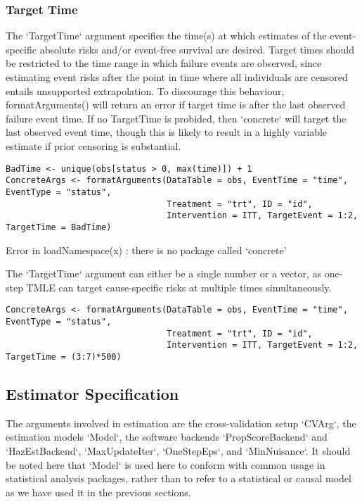 \documentclass{report}
\newcommand{\1}{\ensuremath{\mathbf{1}}}
\begin{document}
\subsubsection{Target Time}
The `TargetTime` argument specifies the time(s) at which estimates of the event-specific absolute risks and/or event-free survival are desired. Target times should be restricted to the time range in which failure events are observed, since estimating event risks after the point in time where all individuals are censored entails unsupported extrapolation. To discourage this behaviour, formatArguments() will return an error if target time is after the last observed failure event time. If no TargetTime is probided, then `concrete` will target the last observed event time, though this is likely to result in a highly variable estimate if prior censoring is substantial.

\begin{lstlisting}
BadTime <- unique(obs[status > 0, max(time)]) + 1
ConcreteArgs <- formatArguments(DataTable = obs, EventTime = "time", EventType = "status", 
                                Treatment = "trt", ID = "id", 
                                Intervention = ITT, TargetEvent = 1:2, TargetTime = BadTime)
\end{lstlisting}

Error in loadNamespace(x) : there is no package called ‘concrete’

The `TargetTime` argument can either be a single number or a vector, as one-step TMLE can target cause-specific risks at multiple times simultaneously.

\begin{lstlisting}
ConcreteArgs <- formatArguments(DataTable = obs, EventTime = "time", EventType = "status", 
                                Treatment = "trt", ID = "id", 
                                Intervention = ITT, TargetEvent = 1:2, TargetTime = (3:7)*500)
\end{lstlisting}

\subsection{Estimator Specification}
The arguments involved in estimation are the cross-validation setup `CVArg`, the estimation models `Model`, the software backends `PropScoreBackend` and `HazEstBackend`, `MaxUpdateIter`, `OneStepEps`, and `MinNuisance`. It should be noted here that `Model` is used here to conform with common usage in statistical analysis packages, rather than to refer to a statistical or causal model as we have used it in the previous sections. 
\end{document}
